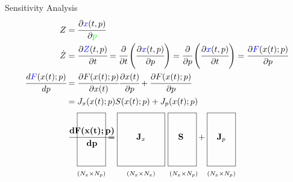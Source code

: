 \documentclass[8pt]{beamer}
\newcommand*{\claps}[1]{\hbox to 0pt{\hss#1\hss}}
\newcommand*{\mat}[1]{\boldsymbol{\mathrm{#1}}}
\newcommand*{\subdims}[3]{\clap{\raisebox{#1}[0pt][0pt]{$\scriptstyle(#2 \times #3)$}}}
\begin{document}
	\begin{frame}[fragile]{Sensitivity Analysis}
		\small{
		\begin{align*}
			Z &= \cfrac{\partial \textcolor{blue}{x}(t,p)}{\partial \textcolor{green}{p}} \nonumber \\
			\dot{Z}  &= \cfrac{\partial \textcolor{blue}{Z}(t,p)}{\partial t} = \cfrac{\partial }{\partial t} \left( \cfrac{\partial \textcolor{blue}{x}(t,p)}{\partial p} \right) = \cfrac{\partial }{\partial p} \left( \cfrac{\partial \textcolor{blue}{x}(t,p)}{\partial t} \right) = \cfrac{\partial \textcolor{blue}{F}(x(t);p)}{\partial p} \\
			\cfrac{d \textcolor{blue}{F}(x(t);p)}{d p} &=  \cfrac{\partial F(x(t);p)}{\partial x(t)} \cfrac{\partial x(t)}{\partial p} + \cfrac{\partial F(x(t);p)}{\partial p}  \\
			& = J_x(x(t);p)S(x(t);p) + J_p(x(t);p)
		\end{align*}
		}
		\tiny{
		\[
		\framebox[1.2cm]{\claps{\raisebox{0pt}[1.0cm][1.0cm]{$\mat {\cfrac{d F(x(t);p)}{dp}} $}}\subdims{-1.5cm} {N_x} {N_p}} =
		\framebox[2.0cm]{\claps{\raisebox{0pt}[1.0cm][1.0cm]{$\mat J_x$}}\subdims{-1.5cm} {N_x} {N_x}} \ 
		\framebox[1.2cm]{\claps{\raisebox{0pt}[1.0cm][1.0cm]{$\mat S$}}  \subdims{-1.5cm} {N_x} {N_p}} + 
		\framebox[1.2cm]{\claps{\raisebox{0pt}[1.0cm][1.0cm]{$\mat J_p$}}\subdims{-1.5cm} {N_x} {N_p}}
		\]}
	
	\end{frame}
\end{document}
